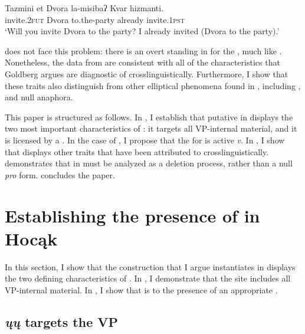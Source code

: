 \documentclass[output=paper]{LSP/langsci}
\begin{document}
\ea\label{ex:johnson:2}
\gll Tazmini {et Dvora} la-misibaʔ Kvar hizmanti.\\
invite.\textsc{2fut} Dvora to.the-party already invite.\textsc{1pst}\\
\trans `Will you invite Dvora to the party? I already invited (Dvora to the party).' \\\citep[14]{Goldberg2005}
\z 

  does not face this problem: there is an overt  standing in for the , much like  . Nonetheless, the data from  are consistent with all of the characteristics that Goldberg argues are diagnostic of  crosslinguistically. Furthermore, I show that these traits also distinguish  from other elliptical phenomena found in , including ,  and null  anaphora. 

This paper is structured as follows. In , I establish that putative  in  displays the two most important characteristics of : it targets all VP-internal material, and it is licensed by a . In the case of , I propose that the  for  is active \emph{v}. In , I show that   displays other traits that have been attributed to  crosslinguistically.  demonstrates that  in  must be analyzed as a deletion process, rather than a null \emph{pro} form.  concludes the paper.

\section{Establishing the presence of  in Hocąk}\label{sec:johnson:2}

In this section, I show that the construction that I argue instantiates  in  displays the two defining characteristics of . In , I demonstrate that the  site includes all VP-internal material. In , I show that  is  to the presence of an appropriate .

\subsection{\emph{ųų} targets the VP}\label{sec:johnson:2.1}
\end{document}
